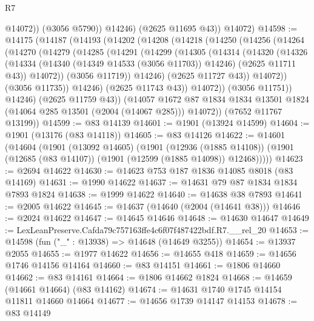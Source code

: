 \begin{lexlean}{R7}
\begin{coremodule}
                @14072))
            (@3056 @5790))
          @14246)
        (@2625 @11695 @43))
      @14072)
@14598 := @14175
    (@14187
      (@14193
        (@14202
          (@14208
            (@14218
              (@14250
                (@14256
                  (@14264
                    (@14270
                      (@14279
                        (@14285
                          (@14291
                            (@14299
                              (@14305
                                (@14314
                                  (@14320
                                    (@14326
                                      (@14334
                                        (@14340 (@14349 @14533 (@3056 @11703)) @14246)
                                        (@2625 @11711 @43))
                                      @14072))
                                  (@3056 @11719))
                                @14246)
                              (@2625 @11727 @43))
                            @14072))
                        (@3056 @11735))
                      @14246)
                    (@2625 @11743 @43))
                  @14072))
              (@3056 @11751))
            @14246)
          (@2625 @11759 @43))
        (@14057
          @1672
          @87
          @1834
          @1834
          @13501
          @1824
          (@14064 @285 @13501 (@2004 (@14067 @285)))
          @14072))
      (@7652 @11767 @13199))
@14599 := @83 @14139
@14601 := @1901 (@13924 @14599)
@14604 := @1901 (@13176 (@83 @14118))
@14605 := @83 @14126
@14622 := @14601
    (@14604
      (@1901
        (@13092 @14605)
        (@1901
          (@12936 (@1885 @14108))
          (@1901 (@12685 (@83 @14107)) (@1901 (@12599 (@1885 @14098)) @12468)))))
@14623 := @2694 @14622
@14630 := @14623 @753 @187 @1836 @14085 @8018 (@83 @14169)
@14631 := @1990 @14622
@14637 := @14631 @79 @87 @1834 @1834 @7893 @1824
@14638 := @1999 @14622
@14640 := @14638 @38 @7893
@14641 := @2005 @14622
@14645 := @14637 (@14640 (@2004 (@14641 @38)))
@14646 := @2024 @14622
@14647 := @14645 @14646
@14648 := @14630 @14647
@14649 := LexLeanPreserve.Cafda79c757163ffe4c6f07f487422bdf.R7.__rel_20
@14653 := @14598 (fun ("_" : @13938) => @14648 (@14649 @3255))
@14654 := @13937 @2055
@14655 := @1977 @14622
@14656 := @14655 @418
@14659 := @14656 @1746 @14156 @14164
@14660 := @83 @14151
@14661 := @1806 @14660
@14662 := @83 @14161
@14664 := @1806 @14662 @1824
@14668 := @14659 (@14661 @14664) (@83 @14162)
@14674 := @14631 @1740 @1745 @14154 @11811 @14660 @14664
@14677 := @14656 @1739 @14147 @14153
@14678 := @83 @14149

\end{coremodule}
\end{lexlean}
